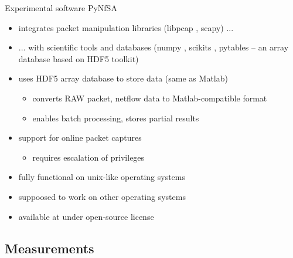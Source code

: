 \documentclass{beamer}
\begin{document}
\begin{frame}{Experimental software PyNfSA}
\begin{itemize}
	\item<1-> integrates packet manipulation libraries (libpcap \cite{jacobson2009libpcap}, scapy) ...
	\item<2->[] ... with  scientific tools and databases (numpy \cite{oliphant2006numpy}, 
	scikits \cite{pedregosa2011scikit}, pytables -- an array database based on HDF5 toolkit)
	\item<3-> uses HDF5 array database to store data (same as Matlab)
	\begin{itemize}
		\item<4-> converts RAW packet, netflow data to Matlab-compatible format
		\item<5-> enables batch processing, stores partial results
	\end{itemize}	
	\item<6-> support for online packet captures 
	\begin{itemize}
		\item<7->	requires escalation of privileges
	\end{itemize}
	\item<8-> fully functional on unix-like operating systems
	\item<9->  suppoosed to work on other operating systems 
	\item<10-> available at \cite{boraros2012pynfsa} under open-source license
\end{itemize}
\end{frame}

\subsection{Measurements}
\end{document}

